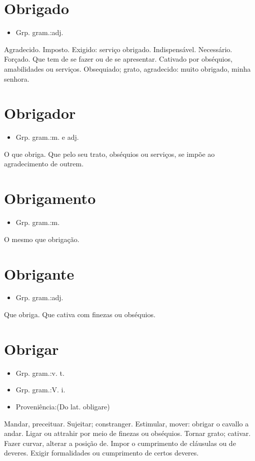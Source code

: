 \section{Obrigado}
\begin{itemize}
\item {Grp. gram.:adj.}
\end{itemize}
Agradecido.
Imposto.
Exigido: \textunderscore serviço obrigado\textunderscore .
Indispensável.
Necessário.
Forçado.
Que tem de se fazer ou de se apresentar.
Cativado por obséquios, amabilidades ou serviços.
Obsequiado; grato, agradecido: \textunderscore muito obrigado, minha senhora\textunderscore .
\section{Obrigador}
\begin{itemize}
\item {Grp. gram.:m.  e  adj.}
\end{itemize}
O que obriga.
Que pelo seu trato, obséquios ou serviços, se impõe ao agradecimento de outrem.
\section{Obrigamento}
\begin{itemize}
\item {Grp. gram.:m.}
\end{itemize}
O mesmo que \textunderscore obrigação\textunderscore .
\section{Obrigante}
\begin{itemize}
\item {Grp. gram.:adj.}
\end{itemize}
Que obriga.
Que cativa com finezas ou obséquios.
\section{Obrigar}
\begin{itemize}
\item {Grp. gram.:v. t.}
\end{itemize}
\begin{itemize}
\item {Grp. gram.:V. i.}
\end{itemize}
\begin{itemize}
\item {Proveniência:(Do lat. \textunderscore obligare\textunderscore )}
\end{itemize}
Mandar, preceituar.
Sujeitar; constranger.
Estimular, mover: \textunderscore obrigar o cavallo a andar\textunderscore .
Ligar ou attrahir por meio de finezas ou obséquios.
Tornar grato; cativar.
Fazer curvar, alterar a posição de.
Impor o cumprimento de cláusulas ou de deveres.
Exigir formalidades ou cumprimento de certos deveres.
